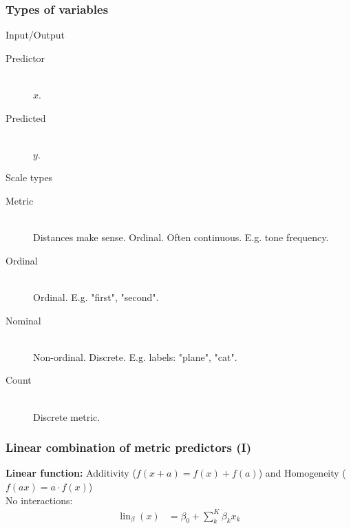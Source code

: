 \documentclass[usenames,dvipsnames,table]{beamer}
\begin{document}
\begin{frame}
\frametitle{Types of variables}
Input/Output
\begin{description}
  \item[Predictor] \mbox{}\\ $x$.
  \item[Predicted] \mbox{}\\ $y$.
\end{description}

Scale types
\begin{description}
  \item[Metric] \mbox{}\\ Distances make sense.  Ordinal. Often continuous. E.g. tone frequency.
  \item[Ordinal] \mbox{}\\ Ordinal. E.g. "first", "second".
  \item[Nominal] \mbox{}\\ Non-ordinal. Discrete. E.g. labels: "plane", "cat".
  \item[Count] \mbox{}\\ Discrete metric.
\end{description}
\end{frame}




\begin{frame}
\frametitle{Linear combination of metric predictors (I)}
\textbf{Linear function:} Additivity ($f(x + a) = f(x) + f(a)$) and Homogeneity ($f(ax) = a\cdot f(x)$)\\

\vspace{1em}
No interactions:
\begin{align*}
\operatorname{lin}_{\beta}(x) &= \beta_0 + \sum_k^K \beta_k x_k \\
\end{align*}

\end{frame}
\end{document}
